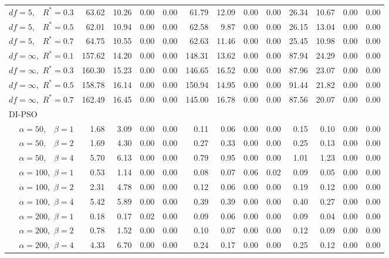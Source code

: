 \documentclass[12pt]{article}
\begin{document}
\begin{appendix}
\begin{table}[ht]
{\begin{tabular}{r|rrrr|rrrr|rrrr}
  $df = 5,\enspace$ $R^* =0.3$ & 63.62 & 10.26 & 0.00 & 0.00 & 61.79 & 12.09 & 0.00 & 0.00 & 26.34 & 10.67 & 0.00 & 0.00 \\ 
  $df = 5,\enspace$ $R^* =0.5$ & 62.01 & 10.94 & 0.00 & 0.00 & 62.58 & 9.87 & 0.00 & 0.00 & 26.15 & 13.04 & 0.00 & 0.00 \\ 
  $df = 5,\enspace$ $R^* =0.7$ & 64.75 & 10.55 & 0.00 & 0.00 & 62.63 & 11.46 & 0.00 & 0.00 & 25.45 & 10.98 & 0.00 & 0.00 \\ 
  $df = \infty,$ $R^* =0.1$ & 157.62 & 14.20 & 0.00 & 0.00 & 148.31 & 13.62 & 0.00 & 0.00 & 87.94 & 24.29 & 0.00 & 0.00 \\ 
  $df = \infty,$ $R^* =0.3$ & 160.30 & 15.23 & 0.00 & 0.00 & 146.65 & 16.52 & 0.00 & 0.00 & 87.96 & 23.07 & 0.00 & 0.00 \\ 
  $df = \infty,$ $R^* =0.5$ & 158.78 & 16.14 & 0.00 & 0.00 & 150.94 & 14.95 & 0.00 & 0.00 & 91.44 & 21.82 & 0.00 & 0.00 \\ 
  $df = \infty,$ $R^* =0.7$ & 162.49 & 16.45 & 0.00 & 0.00 & 145.00 & 16.78 & 0.00 & 0.00 & 87.56 & 20.07 & 0.00 & 0.00 \\ 
\hline
\multicolumn{1}{l|}{DI-PSO} &&&&&&&&&&&&\\
  $\alpha = 50,\enspace$ $\beta =1$ & 1.68 & 3.09 & 0.00 & 0.00 & 0.11 & 0.06 & 0.00 & 0.00 & 0.15 & 0.10 & 0.00 & 0.00 \\ 
  $\alpha = 50,\enspace$ $\beta =2$ & 1.69 & 4.30 & 0.00 & 0.00 & 0.27 & 0.33 & 0.00 & 0.00 & 0.25 & 0.13 & 0.00 & 0.00 \\ 
  $\alpha = 50,\enspace$ $\beta =4$ & 5.70 & 6.13 & 0.00 & 0.00 & 0.79 & 0.95 & 0.00 & 0.00 & 1.01 & 1.23 & 0.00 & 0.00 \\ 
  $\alpha = 100,$ $\beta =1$ & 0.53 & 1.14 & 0.00 & 0.00 & 0.08 & 0.07 & 0.06 & 0.02 & 0.09 & 0.05 & 0.00 & 0.00 \\ 
  $\alpha = 100,$ $\beta =2$ & 2.31 & 4.78 & 0.00 & 0.00 & 0.12 & 0.06 & 0.00 & 0.00 & 0.19 & 0.12 & 0.00 & 0.00 \\ 
  $\alpha = 100,$ $\beta =4$ & 5.42 & 5.89 & 0.00 & 0.00 & 0.39 & 0.39 & 0.00 & 0.00 & 0.40 & 0.27 & 0.00 & 0.00 \\ 
  $\alpha = 200,$ $\beta =1$ & 0.18 & 0.17 & 0.02 & 0.00 & 0.09 & 0.06 & 0.00 & 0.00 & 0.09 & 0.04 & 0.00 & 0.00 \\ 
  $\alpha = 200,$ $\beta =2$ & 0.78 & 1.52 & 0.00 & 0.00 & 0.10 & 0.07 & 0.00 & 0.00 & 0.12 & 0.09 & 0.00 & 0.00 \\ 
  $\alpha = 200,$ $\beta =4$ & 4.33 & 6.70 & 0.00 & 0.00 & 0.24 & 0.17 & 0.00 & 0.00 & 0.25 & 0.12 & 0.00 & 0.00 \\ 

\end{tabular}}
\end{table}
\end{appendix}
\end{document}
